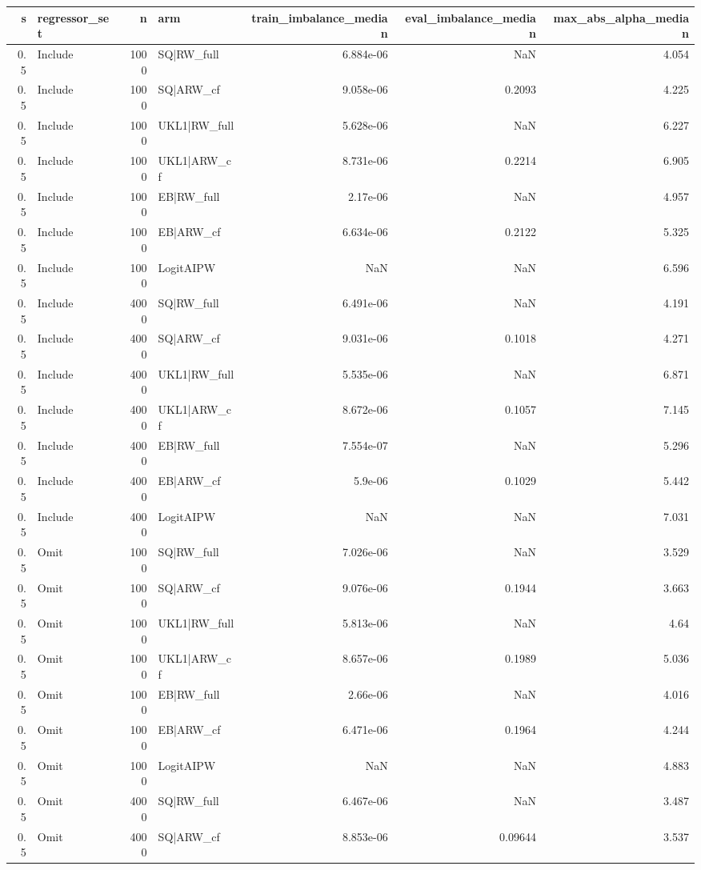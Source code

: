 \begin{tabular}{rlrlrrr}
\toprule
s & regressor\_set & n & arm & train\_imbalance\_median & eval\_imbalance\_median & max\_abs\_alpha\_median \\
\midrule
0.5 & Include & 1000 & SQ|RW\_full & 6.884e-06 & NaN & 4.054 \\
0.5 & Include & 1000 & SQ|ARW\_cf & 9.058e-06 & 0.2093 & 4.225 \\
0.5 & Include & 1000 & UKL1|RW\_full & 5.628e-06 & NaN & 6.227 \\
0.5 & Include & 1000 & UKL1|ARW\_cf & 8.731e-06 & 0.2214 & 6.905 \\
0.5 & Include & 1000 & EB|RW\_full & 2.17e-06 & NaN & 4.957 \\
0.5 & Include & 1000 & EB|ARW\_cf & 6.634e-06 & 0.2122 & 5.325 \\
0.5 & Include & 1000 & LogitAIPW & NaN & NaN & 6.596 \\
0.5 & Include & 4000 & SQ|RW\_full & 6.491e-06 & NaN & 4.191 \\
0.5 & Include & 4000 & SQ|ARW\_cf & 9.031e-06 & 0.1018 & 4.271 \\
0.5 & Include & 4000 & UKL1|RW\_full & 5.535e-06 & NaN & 6.871 \\
0.5 & Include & 4000 & UKL1|ARW\_cf & 8.672e-06 & 0.1057 & 7.145 \\
0.5 & Include & 4000 & EB|RW\_full & 7.554e-07 & NaN & 5.296 \\
0.5 & Include & 4000 & EB|ARW\_cf & 5.9e-06 & 0.1029 & 5.442 \\
0.5 & Include & 4000 & LogitAIPW & NaN & NaN & 7.031 \\
0.5 & Omit & 1000 & SQ|RW\_full & 7.026e-06 & NaN & 3.529 \\
0.5 & Omit & 1000 & SQ|ARW\_cf & 9.076e-06 & 0.1944 & 3.663 \\
0.5 & Omit & 1000 & UKL1|RW\_full & 5.813e-06 & NaN & 4.64 \\
0.5 & Omit & 1000 & UKL1|ARW\_cf & 8.657e-06 & 0.1989 & 5.036 \\
0.5 & Omit & 1000 & EB|RW\_full & 2.66e-06 & NaN & 4.016 \\
0.5 & Omit & 1000 & EB|ARW\_cf & 6.471e-06 & 0.1964 & 4.244 \\
0.5 & Omit & 1000 & LogitAIPW & NaN & NaN & 4.883 \\
0.5 & Omit & 4000 & SQ|RW\_full & 6.467e-06 & NaN & 3.487 \\
0.5 & Omit & 4000 & SQ|ARW\_cf & 8.853e-06 & 0.09644 & 3.537 \\

\end{tabular}
